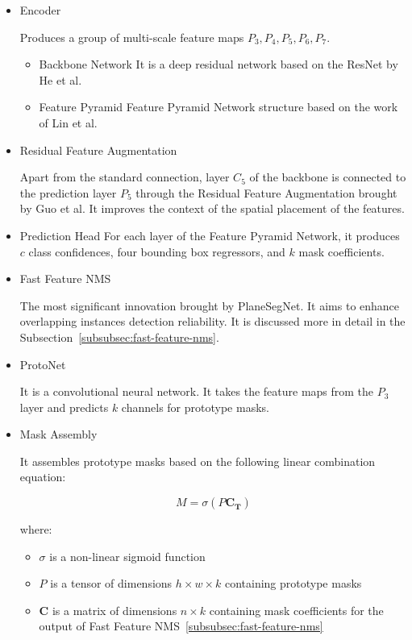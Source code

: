 \begin{itemize}

\item Encoder

Produces a group of multi-scale feature maps ${P_3, P_4, P_5, P_6, P_7}$.

\begin{itemize}

\item Backbone Network
It is a deep residual network based on the ResNet by He et al. \cite{inproceedingsResNet}
\item Feature Pyramid
Feature Pyramid Network structure based on the work of Lin et al. \cite{inproceedingsFPN}

\end{itemize}

\item Residual Feature Augmentation

Apart from the standard connection, layer $C_5$ of the backbone is connected to the prediction layer $P_5$
through the Residual Feature Augmentation brought by Guo et al. \cite{inproceedingsResidualFeatureAugmentation}
It improves the context of the spatial placement of the features.

\item Prediction Head
For each layer of the Feature Pyramid Network, it produces $c$ class confidences,
four bounding box regressors, and $k$ mask coefficients.

\item Fast Feature NMS

The most significant innovation brought by PlaneSegNet.
It aims to enhance overlapping instances detection reliability.
It is discussed more in detail in the Subsection~\ref{subsubsec:fast-feature-nms}.

\item ProtoNet

It is a convolutional neural network.
It takes the feature maps from the $P_3$ layer and predicts $k$ channels for prototype masks.

\item Mask Assembly

It assembles prototype masks based on the following linear combination equation:

\begin{equation} \label{eq:mask-assembly}
    M = \sigma(P\mathbf{C_T})
\end{equation}

where:
\begin{itemize}
    \item $\sigma$ is a non-linear sigmoid function
    \item $P$ is a tensor of dimensions $h \times w \times k$ containing prototype masks
    \item $\mathbf{C}$ is a matrix of dimensions $n \times k$ containing mask coefficients
    for the output of Fast Feature NMS~\ref{subsubsec:fast-feature-nms}
\end{itemize}

\end{itemize}

